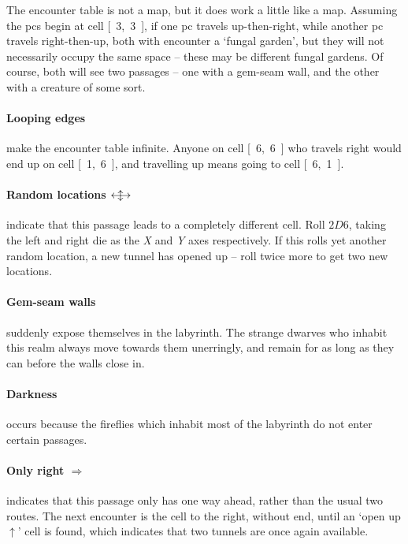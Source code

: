 \begin{multicols}{2}
The encounter table is not a map, but it does work a little like a map.
Assuming the \glspl{pc} begin at cell \mbox{[ 3, 3 ]}, if one \gls{pc} travels up-then-right, while another \gls{pc} travels right-then-up, both with encounter a `fungal garden', but they will not necessarily occupy the same space -- these may be different fungal gardens.
Of course, both will see two passages -- one with a gem-seam wall, and the other with a creature of some sort.

\paragraph{Looping edges}
make the encounter table infinite.
Anyone on cell \mbox{[ 6, 6 ]} who travels right would end up on cell \mbox{[ 1, 6 ]}, and travelling up means going to cell \mbox{[ 6, 1 ]}.

\paragraph{Random locations $\longleftrightarrow\hspace{-1.2em}\updownarrow$}
indicate that this passage leads to a completely different cell.
Roll $2D6$, taking the left and right die as the \textit{X} and \textit{Y} axes respectively.
If this rolls yet another random location, a new tunnel has opened up -- roll twice more to get two new locations.

\paragraph{Gem-seam walls}
suddenly expose themselves in the labyrinth.
The strange dwarves who inhabit this realm always move towards them unerringly, and remain for as long as they can before the walls close in.

\paragraph{Darkness}
occurs because the fireflies which inhabit most of the labyrinth do not enter certain passages.

\paragraph{Only right $\Rightarrow$}
indicates that this passage only has one way ahead, rather than the usual two routes.
The next encounter is the cell to the right, without end, until an `open up $\uparrow$' cell is found,  which indicates that two tunnels are once again available.


\end{multicols}
